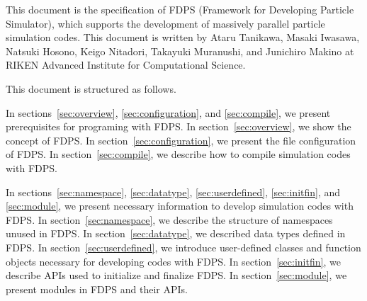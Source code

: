 This document is the specification of FDPS (Framework for Developing
Particle Simulator), which supports the development of massively
parallel particle simulation codes. This document is written by
Ataru Tanikawa, Masaki Iwasawa, Natsuki Hosono, Keigo Nitadori,
Takayuki Muranushi, and Junichiro Makino at RIKEN Advanced Institute
for Computational Science.

This document is structured as follows.

In sections~\ref{sec:overview}, \ref{sec:configuration},
and \ref{sec:compile}, we present prerequisites for programing with
FDPS. In section~\ref{sec:overview}, we show the concept of FDPS. In
section~\ref{sec:configuration}, we present the file configuration of
FDPS. In section~\ref{sec:compile}, we describe how to compile
simulation codes with FDPS.

In sections~\ref{sec:namespace}, \ref{sec:datatype}, \ref{sec:userdefined},
\ref{sec:initfin}, and \ref{sec:module}, we present necessary information
to develop simulation codes with FDPS. In section~\ref{sec:namespace},
we describe the structure of namespaces unused in FDPS. In
section~\ref{sec:datatype}, we described data types defined in
FDPS. In section~\ref{sec:userdefined}, we introduce user-defined
classes and function objects necessary for developing codes with
FDPS. In section~\ref{sec:initfin}, we describe APIs used to
initialize and finalize FDPS. In section~\ref{sec:module}, we present
modules in FDPS and their APIs.

